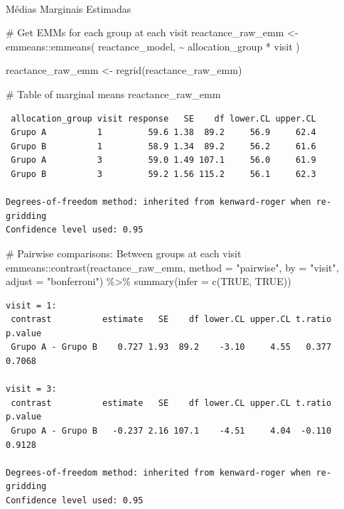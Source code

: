 \documentclass[
  letterpaper,
  DIV=11,
  numbers=noendperiod]{scrartcl}
\makeatletter
\let\oldparagraph\paragraph
\renewcommand{\paragraph}{
    \@ifstar
      \xxxParagraphStar
      \xxxParagraphNoStar
  }
\newcommand{\xxxParagraphStar}[1]{\oldparagraph*{#1}\mbox{}}
\newcommand{\xxxParagraphNoStar}[1]{\oldparagraph{#1}\mbox{}}
\newenvironment{Shaded}{\begin{snugshade}}{\end{snugshade}}
\newcommand{\AttributeTok}[1]{\textcolor[rgb]{0.40,0.45,0.13}{#1}}
\newcommand{\CommentTok}[1]{\textcolor[rgb]{0.37,0.37,0.37}{#1}}
\newcommand{\ConstantTok}[1]{\textcolor[rgb]{0.56,0.35,0.01}{#1}}
\newcommand{\FunctionTok}[1]{\textcolor[rgb]{0.28,0.35,0.67}{#1}}
\newcommand{\NormalTok}[1]{\textcolor[rgb]{0.00,0.23,0.31}{#1}}
\newcommand{\OtherTok}[1]{\textcolor[rgb]{0.00,0.23,0.31}{#1}}
\newcommand{\SpecialCharTok}[1]{\textcolor[rgb]{0.37,0.37,0.37}{#1}}
\newcommand{\StringTok}[1]{\textcolor[rgb]{0.13,0.47,0.30}{#1}}
\makeatother
\begin{document}
\paragraph{Médias Marginais
Estimadas}\label{muxe9dias-marginais-estimadas-18}

\begin{Shaded}
\begin{Highlighting}[]
\CommentTok{\# Get EMMs for each group at each visit}
\NormalTok{reactance\_raw\_emm }\OtherTok{\textless{}{-}}\NormalTok{ emmeans}\SpecialCharTok{::}\FunctionTok{emmeans}\NormalTok{(}
\NormalTok{    reactance\_model, }
    \SpecialCharTok{\textasciitilde{}}\NormalTok{ allocation\_group }\SpecialCharTok{*}\NormalTok{ visit}
\NormalTok{)}

\NormalTok{reactance\_raw\_emm }\OtherTok{\textless{}{-}} \FunctionTok{regrid}\NormalTok{(reactance\_raw\_emm)}

\CommentTok{\# Table of marginal means}
\NormalTok{reactance\_raw\_emm}
\end{Highlighting}
\end{Shaded}

\begin{verbatim}
 allocation_group visit response   SE    df lower.CL upper.CL
 Grupo A          1         59.6 1.38  89.2     56.9     62.4
 Grupo B          1         58.9 1.34  89.2     56.2     61.6
 Grupo A          3         59.0 1.49 107.1     56.0     61.9
 Grupo B          3         59.2 1.56 115.2     56.1     62.3

Degrees-of-freedom method: inherited from kenward-roger when re-gridding 
Confidence level used: 0.95 
\end{verbatim}

\begin{Shaded}
\begin{Highlighting}[]
\CommentTok{\# Pairwise comparisons: Between groups at each visit}
\NormalTok{emmeans}\SpecialCharTok{::}\FunctionTok{contrast}\NormalTok{(reactance\_raw\_emm, }\AttributeTok{method =} \StringTok{"pairwise"}\NormalTok{, }\AttributeTok{by =} \StringTok{"visit"}\NormalTok{, }\AttributeTok{adjust =} \StringTok{"bonferroni"}\NormalTok{) }\SpecialCharTok{\%\textgreater{}\%} \FunctionTok{summary}\NormalTok{(}\AttributeTok{infer =} \FunctionTok{c}\NormalTok{(}\ConstantTok{TRUE}\NormalTok{, }\ConstantTok{TRUE}\NormalTok{))}
\end{Highlighting}
\end{Shaded}

\begin{verbatim}
visit = 1:
 contrast          estimate   SE    df lower.CL upper.CL t.ratio p.value
 Grupo A - Grupo B    0.727 1.93  89.2    -3.10     4.55   0.377  0.7068

visit = 3:
 contrast          estimate   SE    df lower.CL upper.CL t.ratio p.value
 Grupo A - Grupo B   -0.237 2.16 107.1    -4.51     4.04  -0.110  0.9128

Degrees-of-freedom method: inherited from kenward-roger when re-gridding 
Confidence level used: 0.95 
\end{verbatim}
\end{document}
